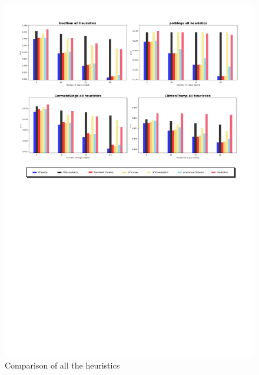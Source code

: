 \begin{figure}[!htbp]
	\begin{center}
	\advance\leftskip-1.3cm
	\captionsetup{justification=centering,margin=2cm}
	\includegraphics[width=1.2\textwidth]{Figures/all2}
	\caption{Comparison of all the heuristics}
	\end{center}
	\label{all2}
\end{figure}







